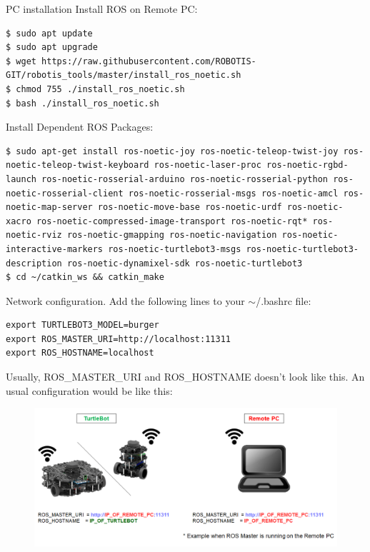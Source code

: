 \begin{frame}{PC installation}
Install ROS on Remote PC:
\begin{lstlisting}[language=shell]
$ sudo apt update
$ sudo apt upgrade
$ wget https://raw.githubusercontent.com/ROBOTIS-GIT/robotis_tools/master/install_ros_noetic.sh
$ chmod 755 ./install_ros_noetic.sh 
$ bash ./install_ros_noetic.sh
\end{lstlisting}

Install Dependent ROS Packages:
\begin{lstlisting}[language=shell]
$ sudo apt-get install ros-noetic-joy ros-noetic-teleop-twist-joy ros-noetic-teleop-twist-keyboard ros-noetic-laser-proc ros-noetic-rgbd-launch ros-noetic-rosserial-arduino ros-noetic-rosserial-python ros-noetic-rosserial-client ros-noetic-rosserial-msgs ros-noetic-amcl ros-noetic-map-server ros-noetic-move-base ros-noetic-urdf ros-noetic-xacro ros-noetic-compressed-image-transport ros-noetic-rqt* ros-noetic-rviz ros-noetic-gmapping ros-noetic-navigation ros-noetic-interactive-markers ros-noetic-turtlebot3-msgs ros-noetic-turtlebot3-description ros-noetic-dynamixel-sdk ros-noetic-turtlebot3
$ cd ~/catkin_ws && catkin_make
\end{lstlisting}

Network configuration. Add the following lines to your $\sim$/.bashrc file:
\begin{lstlisting}[language=shell]
export TURTLEBOT3_MODEL=burger
export ROS_MASTER_URI=http://localhost:11311
export ROS_HOSTNAME=localhost
\end{lstlisting}
Usually, ROS\_MASTER\_URI and ROS\_HOSTNAME doesn't look like this. An usual configuration would be like this:
\begin{figure}
\includegraphics[width=.65\textwidth]{./img/ros/network_configuration.png}
\end{figure}
\end{frame}

